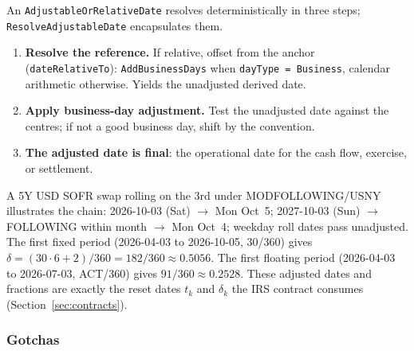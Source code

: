 An \texttt{AdjustableOrRelativeDate} resolves deterministically in three steps; \texttt{ResolveAdjustableDate} encapsulates them.
\begin{enumerate}[nosep]
\item \textbf{Resolve the reference.} If relative, offset from the anchor (\texttt{date\allowbreak Relative\allowbreak To}): \texttt{Add\allowbreak Business\allowbreak Days} when \texttt{dayType = Business}, calendar arithmetic otherwise. Yields the unadjusted derived date.
\item \textbf{Apply business-day adjustment.} Test the unadjusted date against the centres; if not a good business day, shift by the convention.
\item \textbf{The adjusted date is final}: the operational date for the cash flow, exercise, or settlement.
\end{enumerate}
A 5Y USD SOFR swap rolling on the 3rd under MODFOLLOWING/USNY illustrates the chain: 2026-10-03 (Sat) $\to$ Mon Oct~5; 2027-10-03 (Sun) $\to$ FOLLOWING within month $\to$ Mon Oct~4; weekday roll dates pass unadjusted. The first fixed period (2026-04-03 to 2026-10-05, 30/360) gives $\delta=(30\cdot6+2)/360=182/360\approx0.5056$. The first floating period (2026-04-03 to 2026-07-03, ACT/360) gives $91/360\approx0.2528$. These adjusted dates and fractions are exactly the reset dates $t_k$ and $\delta_k$ the IRS contract consumes (Section~\ref{sec:contracts}).

\subsubsection{Gotchas}
\label{sec:cdm-date-gotchas}

